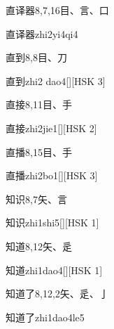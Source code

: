 \begin{entry}{直译器}{8,7,16}{⽬、⾔、⼝}
  \begin{phonetics}{直译器}{zhi2yi4qi4}
  \end{phonetics}
\end{entry}

\begin{entry}{直到}{8,8}{⽬、⼑}
  \begin{phonetics}{直到}{zhi2 dao4}[][HSK 3]
  \end{phonetics}
\end{entry}

\begin{entry}{直接}{8,11}{⽬、⼿}
  \begin{phonetics}{直接}{zhi2jie1}[][HSK 2]
  \end{phonetics}
\end{entry}

\begin{entry}{直播}{8,15}{⽬、⼿}
  \begin{phonetics}{直播}{zhi2bo1}[][HSK 3]
  \end{phonetics}
\end{entry}

\begin{entry}{知识}{8,7}{⽮、⾔}
  \begin{phonetics}{知识}{zhi1shi5}[][HSK 1]
  \end{phonetics}
\end{entry}

\begin{entry}{知道}{8,12}{⽮、⾡}
  \begin{phonetics}{知道}{zhi1dao4}[][HSK 1]
  \end{phonetics}
\end{entry}

\begin{entry}{知道了}{8,12,2}{⽮、⾡、⼅}
  \begin{phonetics}{知道了}{zhi1dao4le5}
  \end{phonetics}
\end{entry}

